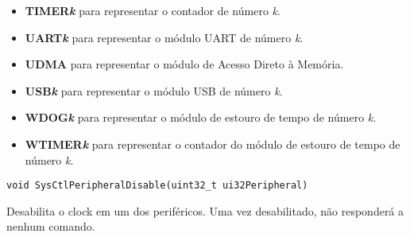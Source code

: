 \begin{description}
\begin{description}
\begin{itemize}
			\item \textbf{TIMER\emph{k}} para representar o contador de número \emph{k}.
			\item \textbf{UART\emph{k}} para representar o módulo UART de número \emph{k}.
			\item \textbf{UDMA} para representar o módulo de Acesso Direto à Memória.
			\item \textbf{USB\emph{k}} para representar o módulo USB de número \emph{k}.
			\item \textbf{WDOG\emph{k}} para representar o módulo de estouro de tempo de número \emph{k}.
			\item \textbf{WTIMER\emph{k}} para representar o contador do módulo de estouro de tempo de número \emph{k}.
		\end{itemize}

	\end{description}
	
\end{description}

\begin{lstlisting}[style=funcao]
	void SysCtlPeripheralDisable(uint32_t ui32Peripheral)
\end{lstlisting}

Desabilita o clock em um dos periféricos. Uma vez desabilitado, não responderá a nenhum comando.


